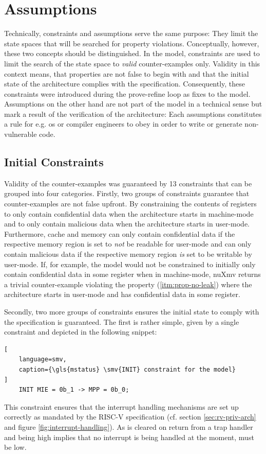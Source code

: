 \section{Assumptions}
\label{sec:assumptions}

Technically,  constraints and assumptions serve the same purpose: They limit the state spaces that will be searched for property violations.
Conceptually, however, these two concepts should be distinguished.
In the model,  constraints are used to limit the search of the state space to \textit{valid} counter-examples only.
Validity in this context means, that properties are not false to begin with and that the initial state of the architecture complies with the specification.
Consequently, these constraints were introduced during the prove-refine loop as fixes to the model.
Assumptions on the other hand are not part of the model in a technical sense but mark a result of the verification of the architecture: Each assumptions constitutes a rule for e.g. \gls{os} or compiler engineers to obey in order to write or generate non-vulnerable code.

\subsection{Initial Constraints}

Validity of the counter-examples was guaranteed by 13  constraints that can be grouped into four categories.
Firstly, two groups of constraints guarantee that counter-examples are not false upfront.
By constraining the contents of registers to only contain confidential data when the architecture starts in machine-mode and to only contain malicious data when the architecture starts in user-mode.
Furthermore, cache and memory can only contain confidential data if the respective memory region is set to \textit{not} be readable for user-mode and can only contain malicious data if the respective memory region \textit{is} set to be writable by user-mode.
If, for example, the model would not be constrained to initially only contain confidential data in some register when in machine-mode, nuXmv returns a trivial counter-example violating the  property (\ref{itm:prop-no-leak}) where the architecture starts in user-mode and has confidential data in some register.

Secondly, two more groups of constraints ensures the initial state to comply with the specification is guaranteed.
The first is rather simple, given by a single constraint and depicted in the following snippet:
\begin{lstlisting}[
    language=smv,
    caption={\gls{mstatus} \smv{INIT} constraint for the model}
]
    INIT MIE = 0b_1 -> MPP = 0b_0;
\end{lstlisting}
This constraint ensures that the interrupt handling mechanisms are set up correctly as mandated by the RISC-V specification (cf. section \ref{sec:rv-priv-arch} and figure \ref{fig:interrupt-handling}).
As  is cleared on return from a trap handler and  being high implies that no interrupt is being handled at the moment,  must be low.

